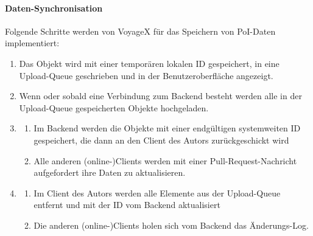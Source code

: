\paragraph{Daten-Synchronisation}
Folgende Schritte werden von VoyageX für das Speichern von PoI-Daten implementiert: 
\begin{enumerate}[leftmargin=*,noitemsep,topsep=1ex,parsep=0pt,partopsep=0pt]
\item Das Objekt wird mit einer temporären lokalen ID gespeichert, in eine Upload-Queue geschrieben und in der Benutzeroberfläche angezeigt.
\item Wenn oder sobald eine Verbindung zum Backend besteht werden alle in der Upload-Queue gespeicherten Objekte hochgeladen.
\item 
\begin{enumerate}[label=\alph*),leftmargin=*,noitemsep,topsep=1ex,parsep=0pt,partopsep=0pt]
\item Im Backend werden die Objekte mit einer endgültigen systemweiten ID gespeichert, die dann
an den Client des Autors zurückgeschickt wird
\item Alle anderen (online-)Clients werden mit einer Pull-Request-Nachricht aufgefordert ihre Daten zu 		aktualisieren.
\end{enumerate}
\item
\begin{enumerate}[label=\alph*),leftmargin=*,noitemsep,topsep=1ex,parsep=0pt,partopsep=0pt]
\item Im Client des Autors werden alle Elemente aus der Upload-Queue entfernt und mit der ID vom Backend aktualisiert
\item Die anderen (online-)Clients holen sich vom Backend das Änderungs-Log.
\end{enumerate}
\end{enumerate}
